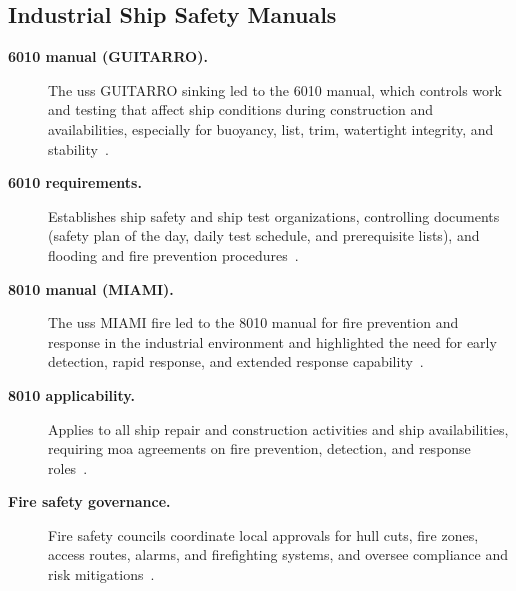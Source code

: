 \documentclass[../main.tex]{subfiles}
\begin{document}
\subsection{Industrial Ship Safety Manuals}
\begin{description}
  \item[\textbf{6010 manual (GUITARRO).}] The \ac{uss} GUITARRO sinking led to the 6010 manual, which controls work and testing that affect ship conditions during construction and availabilities, especially for buoyancy, list, trim, watertight integrity, and stability~\autocite{edo-4-1-5-waterfront-work-control-2025,S9002-AK-CCM-010-6010}.
  \item[\textbf{6010 requirements.}] Establishes ship safety and ship test organizations, controlling documents (safety plan of the day, daily test schedule, and prerequisite lists), and flooding and fire prevention procedures~\autocite{edo-4-1-5-waterfront-work-control-2025,S9002-AK-CCM-010-6010}.
  \item[\textbf{8010 manual (MIAMI).}] The \ac{uss} MIAMI fire led to the 8010 manual for fire prevention and response in the industrial environment and highlighted the need for early detection, rapid response, and extended response capability~\autocite{edo-4-1-5-waterfront-work-control-2025,S0570-AC-CCM-010-8010}.
  \item[\textbf{8010 applicability.}] Applies to all ship repair and construction activities and ship availabilities, requiring \ac{moa} agreements on fire prevention, detection, and response roles~\autocite{edo-4-1-5-waterfront-work-control-2025,S0570-AC-CCM-010-8010}.
  \item[\textbf{Fire safety governance.}] Fire safety councils coordinate local approvals for hull cuts, fire zones, access routes, alarms, and firefighting systems, and oversee compliance and risk mitigations~\autocite{edo-4-1-5-waterfront-work-control-2025}.
\end{description}
\end{document}

